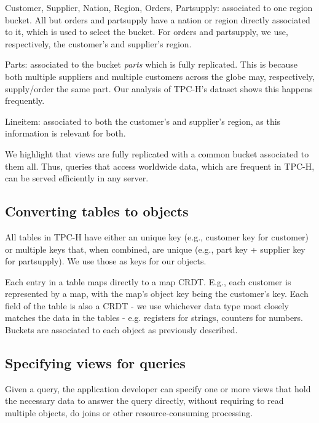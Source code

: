 \documentclass{vldb}
\begin{document}
\begin{compactitem}
	\item Customer, Supplier, Nation, Region, Orders, Partsupply: associated to one region bucket. 
	All but orders and partsupply have a nation or region directly associated to it, which is used to select the bucket.
	For orders and partsupply, we use, respectively, the customer's and supplier's region.
	\item Parts: associated to the bucket \emph{parts} which is fully replicated.
	This is because both multiple suppliers and multiple customers across the globe may, respectively, supply/order the same part.
	Our analysis of TPC-H's dataset shows this happens frequently.
	\item Lineitem: associated to both the customer's and supplier's region, as this information is relevant for both.
\end{compactitem}

We highlight that views are fully replicated with a common bucket associated to them all.
Thus, queries that access worldwide data, which are frequent in TPC-H, can  be served efficiently in any server.

\subsection{Converting tables to objects}
\label{subsec:tables_to_objects}

All tables in TPC-H have either an unique key (e.g., customer key for customer) or multiple keys that, when combined, are unique (e.g., part key + supplier key for partsupply).
We use those as keys for our objects.	%

Each entry in a table maps directly to a map CRDT.
E.g., each customer is represented by a map, with the map's object key being the customer's key.
Each field of the table is also a CRDT - we use whichever data type most closely matches the data in the tables - e.g. registers for strings, counters for numbers.
Buckets are associated to each object as previously described.

\subsection{Specifying views for queries}
\label{subsec:views_for_queries}

Given a query, the application developer can specify one or more views that hold the necessary data to answer the query directly, without requiring to read multiple objects, do joins or other resource-consuming processing.
\end{document}
